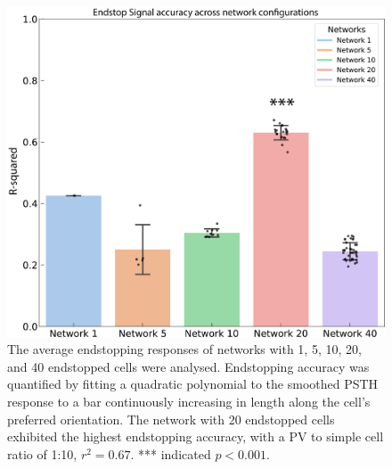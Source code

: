 \documentclass[12pt]{article}
\begin{document}
\begin{figure}[H]
  \centering
  \includegraphics[width=1.0 \textwidth]{adjusted_figures/figure_networks_bar.png}
  \caption{The average endstopping responses of networks with 1, 5, 10, 20, and 40 endstopped cells were analysed. Endstopping accuracy was quantified by fitting a quadratic polynomial to the smoothed PSTH response to a bar continuously increasing in length along the cell's preferred orientation. The network with 20 endstopped cells exhibited the highest endstopping accuracy, with a PV to simple cell ratio of 1:10, $r^2 = 0.67$. *** indicated $p < 0.001$.}
  \label{fig:endstop_network}
\end{figure}
\end{document}
